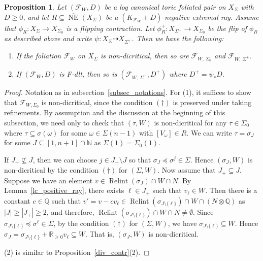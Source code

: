 \documentclass[12pt,reqno]{amsart}
\newtheorem{proposition}[theorem]{Proposition}
\theoremstyle{definition}
\newcommand{\mc}{\mathcal}
\newcommand{\mb}{\mathbb}
\newcommand{\on}{\operatorname}
\newcommand\cF{{\mathcal{F}}}
\newcommand\bQ{{\mathbb Q}}
\begin{document}
\begin{proposition}\label{flip}
    Let $(\cF_W,D)$ be a log canonical toric foliated pair on $X_\Sigma$ with $D\geq 0$, and let $R\subseteq\overline{\on{NE}}(X_\Sigma)$ be a $(K_{\cF_W}+D)$-negative extremal ray. 
    Assume that  $\phi_R\colon X_\Sigma\to X_{\Sigma_0}$ is a flipping contraction. Let $\phi_R^+\colon X_{\Sigma^+}\to X_{\Sigma_0}$ be the flip of $\phi_R$ as described above and write $\psi\colon X_{\Sigma}\dashrightarrow X_{\Sigma^+}$. 
    Then we have the following: 
    \begin{enumerate}
        \item If the foliation $\cF_W$ on $X_\Sigma$ is non-dicritical, then so are $\cF_{W,\,\Sigma_0}$ and $\cF_{W,\,\Sigma^+}$. 
        \item If $(\cF_{W},D)$ is F-dlt, then so is $(\cF_{W,\,\Sigma^+},D^+)$ where $D^+=\psi_*D$. 
    \end{enumerate}
\end{proposition}
\begin{proof} 
    Notation as in subsection~\ref{subsec_notations}. 
    For (1), it suffices to show that $\mc F_{W,\Sigma_0}$ is non-dicritical, since the condition $(\dagger)$ is preserved under taking refinements. By assumption and the discussion at the beginning of this subsection, we need only to check that $(\tau,W)$ is non-dicritical for any $\tau\in\Sigma_0$ where $\tau\subseteq\sigma(\omega)$ for some $\omega\in\Sigma(n-1)$ with $[V_{\omega}]\in R$. We can write $\tau=\sigma_J$ for some $J\subseteq [1,n+1]\cap\mb N$ as $\Sigma(1)=\Sigma_0(1)$. 
        
    If $J_+\nsubseteq J$, then we can choose $j\in J_+\setminus J$ so that $\sigma_J\preceq\sigma^j\in\Sigma$. Hence $(\sigma_J,W)$ is non-dicritical by the condition $(\dagger)$ for $(\Sigma,W)$.
    Now assume that $J_+\subseteq J$. Suppose we have an element $v\in\on{Relint}(\sigma_J)\cap W\cap N$. By Lemma~\ref{lc_positive_ray}, there exists $\ell\in J_+$ such that $v_\ell\in W$. Then there is a constant $c\in\bQ$ such that $v'=v-cv_{\ell}\in\on{Relint}(\sigma_{J\setminus\{\ell\}})\cap W\cap (N\otimes\bQ)$ as $|J|\geq |J_+|\geq 2$, and therefore,  $\on{Relint}(\sigma_{J\setminus\{\ell\}})\cap W\cap N\neq\emptyset$. Since $\sigma_{J\setminus\{\ell\}}\preceq\sigma^\ell\in\Sigma$, by the condition $(\dagger)$ for $(\Sigma,W)$, we have $\sigma_{J\setminus\{\ell\}}\subseteq W$. Hence $\sigma_J=\sigma_{J\setminus\{\ell\}}+\mb R_{\geq 0}v_\ell\subseteq W$. That is, $(\sigma_J,W)$ is non-dicritical.

    (2) is similar to Proposition~\ref{div_contr}(2).
\end{proof}
\end{document}

